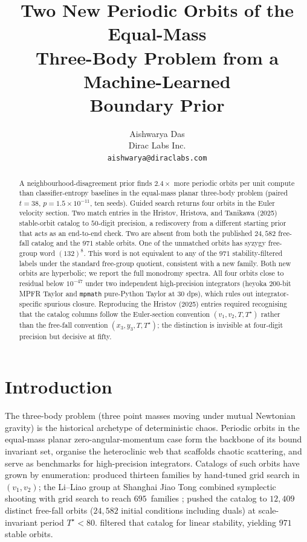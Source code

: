 \documentclass[10pt]{article}
\title{\bfseries Two New Periodic Orbits of the Equal-Mass\\
  Three-Body Problem from a Machine-Learned\\
  Boundary Prior}
\author{Aishwarya Das\\\small Dirac Labs Inc.\\\small \texttt{aishwarya@diraclabs.com}}
\date{}
\newcommand{\Tstar}{T^{\star}}
\begin{document}
\maketitle

\begin{abstract}
\noindent A neighbourhood-disagreement prior finds $2.4\times$ more
periodic orbits per unit compute than classifier-entropy baselines in
the equal-mass planar three-body problem (paired $t = 38$,
$p = 1.5\!\times\!10^{-11}$, ten seeds). Guided search returns four
orbits in the Euler velocity section. Two match entries in the Hristov,
Hristova, and Tanikawa (2025) stable-orbit catalog to $50$-digit
precision, a rediscovery from a different starting prior that acts as
an end-to-end check. Two are absent from both the published $24{,}582$
free-fall catalog and the $971$ stable orbits. One of the unmatched
orbits has syzygy free-group word $(132)^{8}$. This word is not
equivalent to any of the $971$ stability-filtered labels under the
standard free-group quotient, consistent with a new family. Both new
orbits are hyperbolic; we report the full monodromy spectra. All four
orbits close to residual below $10^{-47}$ under two independent
high-precision integrators (heyoka $200$-bit MPFR Taylor and
\texttt{mpmath} pure-Python Taylor at $30$ dps), which rules out
integrator-specific spurious closure. Reproducing the Hristov (2025)
entries required recognising that the catalog columns follow the
Euler-section convention $(v_1, v_2, T, \Tstar)$ rather than the
free-fall convention $(x_3, y_3, T, \Tstar)$; the distinction is
invisible at four-digit precision but decisive at fifty.
\end{abstract}

\section{Introduction}

The three-body problem (three point masses moving under mutual
Newtonian gravity) is the historical archetype of deterministic
chaos. Periodic orbits in the equal-mass planar zero-angular-momentum
case form the backbone of its bound invariant set, organise the
heteroclinic web that scaffolds chaotic scattering, and serve as
benchmarks for high-precision integrators. Catalogs of such orbits
have grown by enumeration: \citet{Suvakov2013} produced thirteen
families by hand-tuned grid search in $(v_1, v_2)$; the Li--Liao group
at Shanghai Jiao Tong combined symplectic shooting with grid search to
reach $695$~families \citep{LiLiao2017}; \citet{Hristov2024Catalog}
pushed the catalog to $12{,}409$ distinct free-fall orbits ($24{,}582$
initial conditions including duals) at scale-invariant period
$\Tstar < 80$. \citet{Hristov2025Stable} filtered that catalog for
linear stability, yielding $971$ stable orbits.
\end{document}
